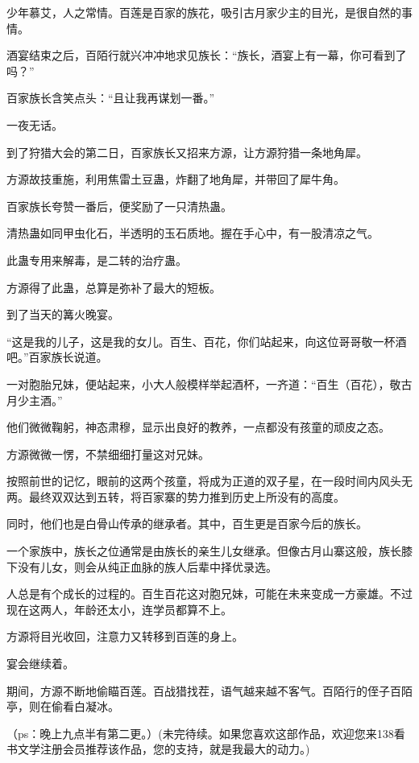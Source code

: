 \begin{this_body}
少年慕艾，人之常情。百莲是百家的族花，吸引古月家少主的目光，是很自然的事情。

酒宴结束之后，百陌行就兴冲冲地求见族长：“族长，酒宴上有一幕，你可看到了吗？”

百家族长含笑点头：“且让我再谋划一番。”

一夜无话。

到了狩猎大会的第二日，百家族长又招来方源，让方源狩猎一条地角犀。

方源故技重施，利用焦雷土豆蛊，炸翻了地角犀，并带回了犀牛角。

百家族长夸赞一番后，便奖励了一只清热蛊。

清热蛊如同甲虫化石，半透明的玉石质地。握在手心中，有一股清凉之气。

此蛊专用来解毒，是二转的治疗蛊。

方源得了此蛊，总算是弥补了最大的短板。

到了当天的篝火晚宴。

“这是我的儿子，这是我的女儿。百生、百花，你们站起来，向这位哥哥敬一杯酒吧。”百家族长说道。

一对胞胎兄妹，便站起来，小大人般模样举起酒杯，一齐道：“百生（百花），敬古月少主酒。”

他们微微鞠躬，神态肃穆，显示出良好的教养，一点都没有孩童的顽皮之态。

方源微微一愣，不禁细细打量这对兄妹。

按照前世的记忆，眼前的这两个孩童，将成为正道的双子星，在一段时间内风头无两。最终双双达到五转，将百家寨的势力推到历史上所没有的高度。

同时，他们也是白骨山传承的继承者。其中，百生更是百家今后的族长。

一个家族中，族长之位通常是由族长的亲生儿女继承。但像古月山寨这般，族长膝下没有儿女，则会从纯正血脉的族人后辈中择优录选。

人总是有个成长的过程的。百生百花这对胞兄妹，可能在未来变成一方豪雄。不过现在这两人，年龄还太小，连学员都算不上。

方源将目光收回，注意力又转移到百莲的身上。

宴会继续着。

期间，方源不断地偷瞄百莲。百战猎找茬，语气越来越不客气。百陌行的侄子百陌亭，则在偷看白凝冰。

（ps：晚上九点半有第二更。）(未完待续。如果您喜欢这部作品，欢迎您来138看书文学注册会员推荐该作品，您的支持，就是我最大的动力。)

\end{this_body}

